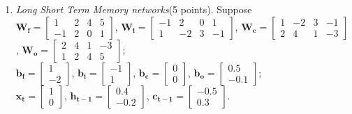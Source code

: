 \documentclass{article}
\begin{document}
\begin{enumerate}
    
    
    
    
    \newpage
    \item \textit{Long Short Term Memory networks}(5 points). Suppose \\
    $\bm{W_f}=\left[\begin{array}{cccc}
    1&2&4&5\\
    -1&2&0&1
    \end{array}\right]$, 
    $\bm{W_i}=\left[\begin{array}{cccc}
    -1&2&0&1\\ 
    1&-2&3&-1 
    \end{array}\right]$, 
    $\bm{W_c}=\left[\begin{array}{cccc}
    1&-2&3&-1\\
    2&4&1&-3
    \end{array}\right]$, 
    $\bm{W_o}=\left[\begin{array}{cccc}
    2&4&1&-3\\
    1&2&4&5
    \end{array}\right]$;\\ 
    $\bm{b_f}=\left[\begin{array}{c}
    1\\
    -2 
    \end{array}\right]$, 
    $\bm{b_i}=\left[\begin{array}{c}
    -1\\
    1 
    \end{array}\right]$, 
    $\bm{b_c}=\left[\begin{array}{c}
    0\\
    0 
    \end{array}\right]$, 
    $\bm{b_o}=\left[\begin{array}{c}
    0.5\\
    -0.1
    \end{array}\right]$;\\
    $\bm{x_t}=\left[\begin{array}{c}
    1\\
    0 
    \end{array}\right]$, 
    $\bm{h_{t-1}}=\left[\begin{array}{c}
    0.4\\
    -0.2 
    \end{array}\right]$, 
    $\bm{c_{t-1}}=\left[\begin{array}{c}
    -0.5\\
    0.3 
    \end{array}\right]$.\\ 

\end{enumerate}
\end{document}
